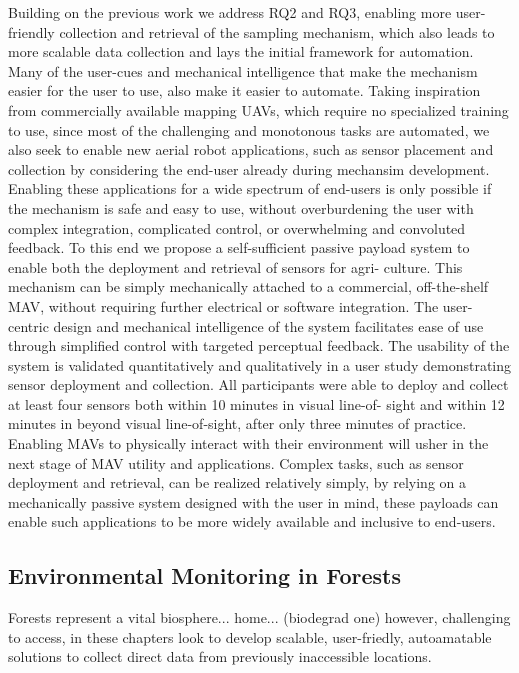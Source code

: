 Building on the previous work we address RQ2 and RQ3, enabling more user-friendly collection and retrieval of the sampling mechanism, which also leads to more scalable data collection and lays the initial framework for automation. Many of the user-cues and mechanical intelligence that make the mechanism easier for the user to use, also make it easier to automate. Taking inspiration from commercially available mapping UAVs, which require no specialized training to use, since most of the challenging and monotonous tasks are automated, we also seek to enable new aerial robot applications, such as sensor placement and collection by considering the end-user already during mechansim development. Enabling these applications for a wide spectrum of end-users is only possible if the mechanism is safe and easy to use, without overburdening the user with complex integration, complicated control, or overwhelming and convoluted feedback. To this end we propose a self-sufficient passive payload system to enable both the deployment and retrieval of sensors for agri- culture. This mechanism can be simply mechanically attached to a commercial, off-the-shelf MAV, without requiring further electrical or software integration. The user-centric design and mechanical intelligence of the system facilitates ease of use through simplified control with targeted perceptual feedback. The usability of the system is validated quantitatively and qualitatively in a user study demonstrating sensor deployment and collection. All participants were able to deploy and collect at least four sensors both within 10 minutes in visual line-of- sight and within 12 minutes in beyond visual line-of-sight, after only three minutes of practice. Enabling MAVs to physically interact with their environment will usher in the next stage of MAV utility and applications. Complex tasks, such as sensor deployment and retrieval, can be realized relatively simply, by relying on a mechanically passive system designed with the user in mind, these payloads can enable such applications to be more widely available and inclusive to end-users.



\subsection{Environmental Monitoring in Forests}
Forests represent a vital biosphere... home... (biodegrad one)
however, challenging to access, in these chapters look to develop scalable, user-friedly, autoamatable solutions to collect direct data from previously inaccessible locations.

